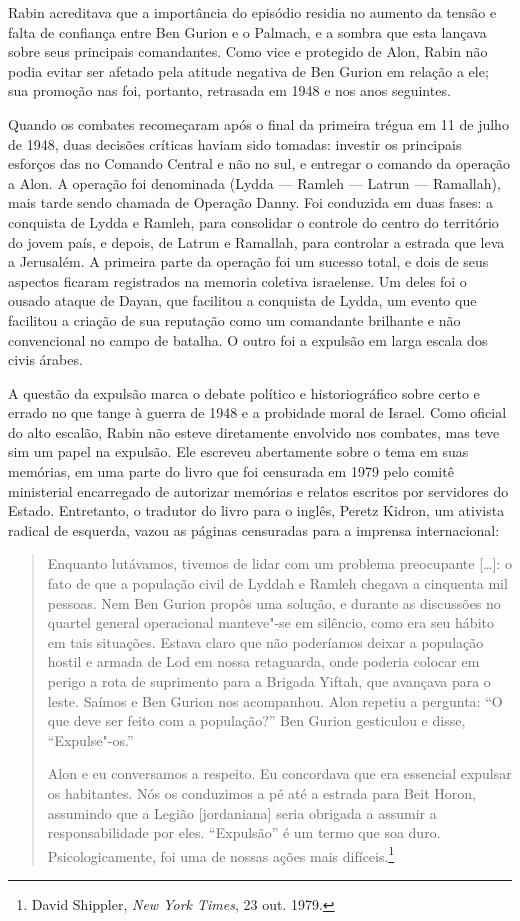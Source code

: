 Rabin acreditava que a importância do episódio residia no aumento da
tensão e falta de confiança entre Ben Gurion e o Palmach, e a sombra que
esta lançava sobre seus principais comandantes. Como vice e protegido de
Alon, Rabin não podia evitar ser afetado pela atitude negativa de Ben
Gurion em relação a ele; sua promoção nas  foi, portanto, retrasada
em 1948 e nos anos seguintes.

Quando os combates recomeçaram após o final da primeira trégua em 11 de
julho de 1948, duas decisões críticas haviam sido tomadas: investir os
principais esforços das  no Comando Central e não no sul, e entregar
o comando da operação a Alon. A operação foi denominada  (Lydda ---
Ramleh --- Latrun --- Ramallah), mais tarde sendo chamada de Operação
Danny. Foi conduzida em duas fases: a conquista de Lydda e Ramleh, para
consolidar o controle do centro do território do jovem país, e depois,
de Latrun e Ramallah, para controlar a estrada que leva a Jerusalém. A
primeira parte da operação foi um sucesso total, e dois de seus aspectos
ficaram registrados na memoria coletiva israelense. Um deles foi o
ousado ataque de Dayan, que facilitou a conquista de Lydda, um evento
que facilitou a criação de sua reputação como um comandante brilhante e
não convencional no campo de batalha. O outro foi a expulsão em larga
escala dos civis árabes.

A questão da expulsão marca o debate político e historiográfico
sobre certo e errado no que tange à guerra de 1948 e a probidade
moral de Israel. Como oficial do alto escalão, Rabin não esteve
diretamente envolvido nos combates, mas teve sim um papel na expulsão.
Ele escreveu abertamente sobre o tema em suas memórias, em uma parte do
livro que foi censurada em 1979 pelo comitê ministerial encarregado de
autorizar memórias e relatos escritos por servidores do Estado.
Entretanto, o tradutor do livro para o inglês, Peretz Kidron, um
ativista radical de esquerda, vazou as páginas censuradas para a
imprensa internacional:

\begin{quote}
Enquanto lutávamos, tivemos de lidar com um problema preocupante {[}\ldots{}{]}: o
fato de que a população civil de Lyddah e Ramleh chegava a cinquenta mil
pessoas. Nem Ben Gurion propôs uma solução, e durante as discussões no
quartel general operacional manteve"-se em silêncio, como era seu hábito
em tais situações. Estava claro que não poderíamos deixar a população
hostil e armada de Lod em nossa retaguarda, onde poderia colocar em
perigo a rota de suprimento para a Brigada Yiftah, que avançava para o
leste. Saímos e Ben Gurion nos acompanhou. Alon repetiu a pergunta: ``O
que deve ser feito com a população?'' Ben Gurion gesticulou e disse, %
``Expulse"-os.''

Alon e eu conversamos a respeito. Eu concordava que era essencial
expulsar os habitantes. Nós os conduzimos a pé até a estrada para Beit
Horon, assumindo que a Legião {[}jordaniana{]} seria obrigada a assumir a
responsabilidade por eles. ``Expulsão'' é um termo que soa duro.
Psicologicamente, foi uma de nossas ações mais difíceis.\footnote{David Shippler, \emph{New York Times}, 23 out. 1979.}
\end{quote}

